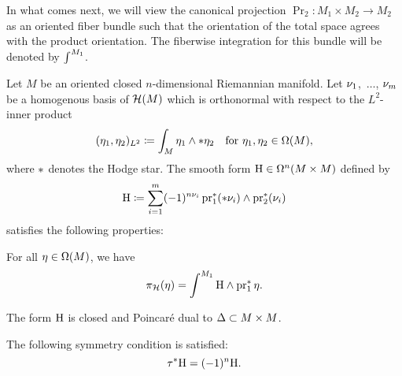 \documentclass[\MainFolder/Text.tex]{subfiles}
\begin{document}
In what comes next, we will view the canonical projection $\Pr_2 : M_1 \times M_2 \rightarrow M_2$ as an oriented fiber bundle such that the orientation of the total space agrees with the product orientation.
The fiberwise integration for this bundle will be denoted by $\int^{M_1}$. 

\begin{Proposition} \label{Lemma:HKer}
Let $M$ be an oriented closed $n$-dimensional Riemannian manifold.
Let $\nu_1$,~$\dotsc$, $\nu_m$ be a homogenous basis of $\mathcal{H}(M)$ which is orthonormal with respect to the $L^2$-inner product 
\[ (\eta_1, \eta_2)_{L^2} \coloneqq \int_M \eta_1 \wedge *\eta_2\quad\text{for }\eta_1, \eta_2 \in \Omega(M), \]
where $*$ denotes the Hodge star.
The smooth form $\mathrm{H} \in \Omega^n(M\times M)$ defined by
\begin{equation}\label{Eq:HKerHKerHKer}
\mathrm{H} \coloneqq \sum_{i=1}^m (-1)^{n \nu_i}\operatorname{\mathrm{pr}}_1^*(* \nu_i) \wedge \operatorname{\mathrm{pr}}_2^*(\nu_i)
\end{equation}
satisfies the following properties:
\begin{ClaimList}
\item For all $\eta\in \Omega(M)$, we have
\begin{equation*}
 \operatorname{\pi_{\mathcal{H}}}(\eta) = \int^{M_1} \mathrm{H}\wedge \operatorname{\mathrm{pr}}_1^*\eta.
\end{equation*} 
\item The form $\mathrm{H}$ is closed and Poincar\'e dual to $\Delta \subset M\times M$.
\item The following symmetry condition is satisfied:
\begin{equation} \label{Eq:SymHKer}
\tau^* \mathrm{H} = (-1)^n \mathrm{H}.
\end{equation}
\end{ClaimList}
\end{Proposition}
%
\end{document}
